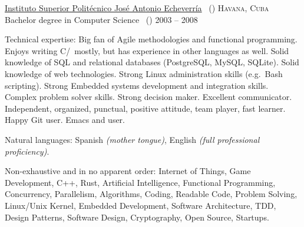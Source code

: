 \documentclass[10pt,a4paper]{article}
\begin{document}
                                \spacedhrule{-0.2em}{-0.4em}


                                \headedsection
                                        {\href{http://cujae.edu.cu}{Instituto Superior Polit\'ecnico Jos\'e Antonio Echeverr\'ia} \textnormal{~()}}
                                        {\textsc{Havana, Cuba}} {%
                                            \headedsubsection
                                                    {Bachelor degree in Computer Science \textnormal{~()}}
                                                    {2003 -- 2008}
                                                    {}
                                        }

                                        \spacedhrule{0.5em}{-0.4em}


                                        \inlineheadsection  %
                                                {Technical expertise:}
                                                {Big fan of Agile methodologies and functional programming. Enjoys writing C/\nsp\CPP\nsp\, mostly, but has experience in other languages as well. Solid knowledge of SQL and relational databases (PostgreSQL, MySQL, SQLite). Solid knowledge of web technologies. Strong Linux administration skills (e.g.\ Bash scripting). Strong Embedded systems development and integration skills. Complex problem solver skills. Strong decision maker. Excellent communicator. Independent, organized, punctual, positive attitude, team player, fast learner. Happy Git user. Emacs and  user.}

                                                \vspace{0.5em}
                                                \inlineheadsection
                                                        {Natural languages:}
                                                        {Spanish \emph{(mother tongue)}, English \emph{(full professional proficiency)}.}

                                                        \spacedhrule{1.6em}{-0.4em}


                                                        \inlineheadsection
                                                                {Non-exhaustive and in no apparent order:}
                                                                {Internet of Things, Game Development, C++, Rust, Artificial Intelligence, Functional Programming, Concurrency, Parallelism, Algorithms, Coding, Readable Code, Problem Solving, Linux/Unix Kernel, Embedded Development, Software Architecture, TDD, Design Patterns, Software Design, Cryptography, Open Source, Startups.}
\end{document}
